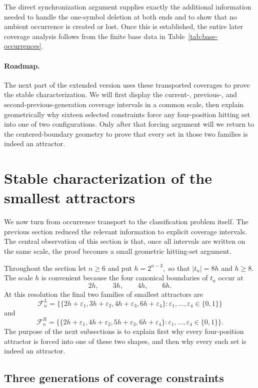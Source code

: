 \documentclass[11pt,a4paper]{article}
\theoremstyle{definition}\newtheorem{definition}[theorem]{Definition}
\theoremstyle{remark}\newtheorem{remark}[theorem]{Remark}
\newcommand{\FL}{\mathcal{F}^{L}}
\newcommand{\FR}{\mathcal{F}^{R}}
\begin{document}
The direct synchronization argument supplies exactly the additional information needed to handle the one-symbol deletion at both ends and to show that no ambient occurrence is created or lost. Once this is established, the entire later coverage analysis follows from the finite base data in Table~\ref{tab:base-occurrences}.

\paragraph{Roadmap.}
The next part of the extended version uses these transported coverages to prove the stable characterization. We will first display the current-, previous-, and second-previous-generation coverage intervals in a common scale, then explain geometrically why sixteen selected constraints force any four-position hitting set into one of two configurations. Only after that forcing argument will we return to the centered-boundary geometry to prove that every set in those two families is indeed an attractor.



\section{Stable characterization of the smallest attractors}
\label{sec:stable-characterization}

We now turn from occurrence transport to the classification problem itself.  The previous section reduced the relevant information to explicit coverage intervals.  The central observation of this section is that, once all intervals are written on the same scale, the proof becomes a small geometric hitting-set argument.

Throughout the section let $n\ge6$ and put
$
 h=2^{n-3},
$
so that $|t_n|=8h$ and $h\ge8$.  The scale $h$ is convenient because the four canonical boundaries of $t_n$ occur at
\[
 2h,\qquad 3h,\qquad 4h,\qquad 6h.
\]
At this resolution the final two families of smallest attractors are
\[
\FL_n=
\bigl\{\{2h+\varepsilon_1,3h+\varepsilon_2,4h+\varepsilon_3,6h+\varepsilon_4\}:
\varepsilon_1,\ldots,\varepsilon_4\in\{0,1\}\bigr\}
\]
and
\[
\FR_n=
\bigl\{\{2h+\varepsilon_1,4h+\varepsilon_2,5h+\varepsilon_3,6h+\varepsilon_4\}:
\varepsilon_1,\ldots,\varepsilon_4\in\{0,1\}\bigr\}.
\]
The purpose of the next subsections is to explain first why every four-position attractor is forced into one of these two shapes, and then why every such set is indeed an attractor.

\subsection{Three generations of coverage constraints}
\label{subsec:ABC-coverages}
\end{document}

